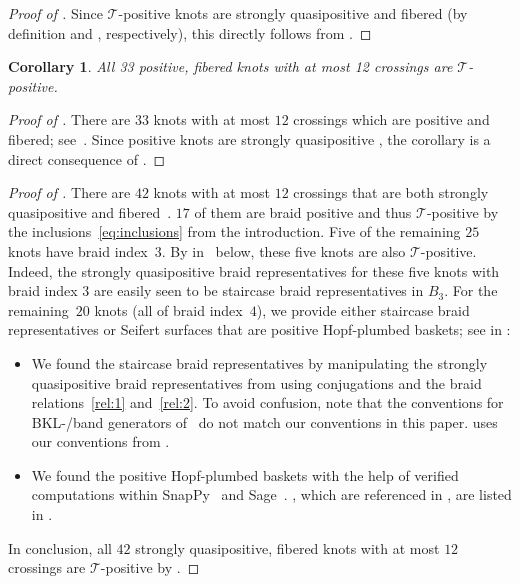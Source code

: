 \documentclass{amsart}
\theoremstyle{definition}
\theoremstyle{remark}
\theoremstyle{plain}
\newtheorem{corollary}[definition]{Corollary}
\newcommand{\T}{\mathcal{T}}
\begin{document}
\begin{proof}[{Proof of }]
    Since $\T$-positive knots are strongly quasipositive and fibered (by definition and , respectively), this directly follows from . 
\end{proof}


\begin{corollary}%
\label{prop:pos_fib_small_crossing_nr}
    All 33 positive, fibered knots with at most 12 crossings are $\T$-positive. 
\end{corollary}

\begin{proof}[{Proof of }]
    There are $33$ knots with at most $12$ crossings which are positive and fibered; see~\cite{knotinfo}. Since positive knots are strongly quasipositive \cite{Rudolph_positiveLinksSQP,nakamura}, the corollary is a direct consequence of . 
\end{proof}

\begin{proof}[{Proof of }]
There are $42$ knots with at most $12$ crossings that are both strongly quasipositive and fibered~\cite{knotinfo}. $17$ of them are braid positive and thus $\T$-positive by the inclusions~\eqref{eq:inclusions} from the introduction. Five of the remaining $25$ knots have braid index~$3$. By  in~ below, these five knots are also $\T$-positive. Indeed, the strongly quasipositive braid representatives for these five knots with braid index $3$ are easily seen to be staircase braid representatives in $B_3$. For the remaining~$20$ knots (all of braid index~$4$), we provide either staircase braid representatives or Seifert surfaces that are positive Hopf-plumbed baskets; see  in :
\begin{itemize}
\item We found the staircase braid representatives by manipulating the strongly quasipositive braid representatives from \cite{knotinfo} using conjugations and the braid relations~\eqref{rel:1} and~\eqref{rel:2}. To avoid confusion, note that the conventions for BKL-/band generators of~\cite{knotinfo} do not match our conventions in this paper.  uses our conventions from .
\item We found the positive Hopf-plumbed baskets with the help of verified computations within SnapPy~\cite{SnapPy} and Sage~\cite{sagemath}. , which are referenced in , are listed in .
\end{itemize} 
In conclusion, all $42$ strongly quasipositive, fibered knots with at most $12$ crossings are $\T$-positive by . 
\end{proof}
\end{document}

